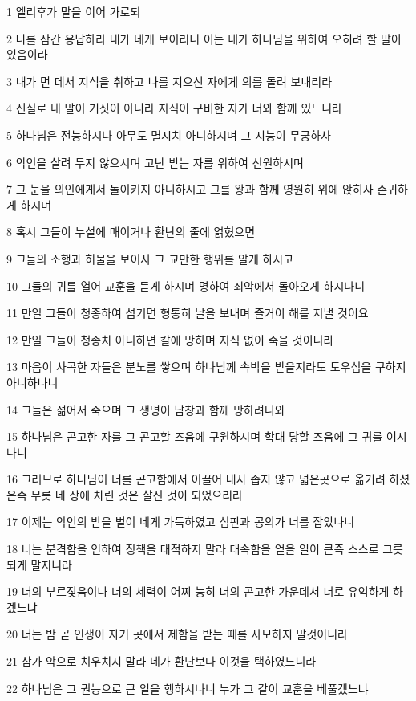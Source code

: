 \par 1 엘리후가 말을 이어 가로되
\par 2 나를 잠간 용납하라 내가 네게 보이리니 이는 내가 하나님을 위하여 오히려 할 말이 있음이라
\par 3 내가 먼 데서 지식을 취하고 나를 지으신 자에게 의를 돌려 보내리라
\par 4 진실로 내 말이 거짓이 아니라 지식이 구비한 자가 너와 함께 있느니라
\par 5 하나님은 전능하시나 아무도 멸시치 아니하시며 그 지능이 무궁하사
\par 6 악인을 살려 두지 않으시며 고난 받는 자를 위하여 신원하시며
\par 7 그 눈을 의인에게서 돌이키지 아니하시고 그를 왕과 함께 영원히 위에 앉히사 존귀하게 하시며
\par 8 혹시 그들이 누설에 매이거나 환난의 줄에 얽혔으면
\par 9 그들의 소행과 허물을 보이사 그 교만한 행위를 알게 하시고
\par 10 그들의 귀를 열어 교훈을 듣게 하시며 명하여 죄악에서 돌아오게 하시나니
\par 11 만일 그들이 청종하여 섬기면 형통히 날을 보내며 즐거이 해를 지낼 것이요
\par 12 만일 그들이 청종치 아니하면 칼에 망하며 지식 없이 죽을 것이니라
\par 13 마음이 사곡한 자들은 분노를 쌓으며 하나님께 속박을 받을지라도 도우심을 구하지 아니하나니
\par 14 그들은 젊어서 죽으며 그 생명이 남창과 함께 망하려니와
\par 15 하나님은 곤고한 자를 그 곤고할 즈음에 구원하시며 학대 당할 즈음에 그 귀를 여시나니
\par 16 그러므로 하나님이 너를 곤고함에서 이끌어 내사 좁지 않고 넓은곳으로 옮기려 하셨은즉 무릇 네 상에 차린 것은 살진 것이 되었으리라
\par 17 이제는 악인의 받을 벌이 네게 가득하였고 심판과 공의가 너를 잡았나니
\par 18 너는 분격함을 인하여 징책을 대적하지 말라 대속함을 얻을 일이 큰즉 스스로 그릇되게 말지니라
\par 19 너의 부르짖음이나 너의 세력이 어찌 능히 너의 곤고한 가운데서 너로 유익하게 하겠느냐
\par 20 너는 밤 곧 인생이 자기 곳에서 제함을 받는 때를 사모하지 말것이니라
\par 21 삼가 악으로 치우치지 말라 네가 환난보다 이것을 택하였느니라
\par 22 하나님은 그 권능으로 큰 일을 행하시나니 누가 그 같이 교훈을 베풀겠느냐
